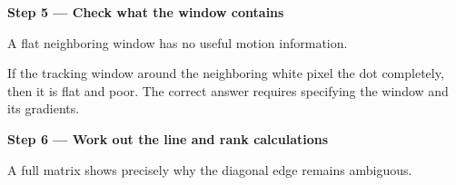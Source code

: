 \documentclass[letterpaper,11pt,english,openany,oneside]{jupyterBook}
\begin{document}
\par

\par\medskip{}
{\color{QuizStepRed}\bfseries Step 5 — Check what the window contains}\par\smallskip

\sphinxAtStartPar
{} A flat neighboring window has no useful motion information.

\sphinxAtStartPar
If the tracking window around the neighboring white pixel  the dot completely, then it is flat and poor. The correct answer requires specifying the window and its gradients.

\par

\par\medskip{}
{\color{QuizStepRed}\bfseries Step 6 — Work out the line and rank calculations}\par\smallskip

\sphinxAtStartPar
{} A full matrix shows precisely why the diagonal edge remains ambiguous.
\end{document}
